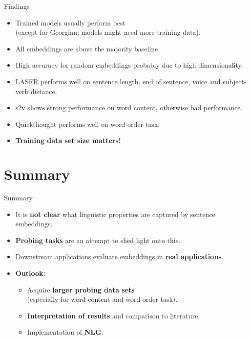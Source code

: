 \documentclass[accentcolor=tud1a,colorbacktitle,inverttitle,landscape,german,presentation,t]{tudbeamer}
\begin{document}
\begin{frame}{Findings}{}
	\vspace*{-4mm}
	\begin{itemize}\setlength\itemsep{1em}
		\item Trained models usually perform best \\
			(except for Georgian; models might need more training data).
		\item All embeddings are above the majority baseline.
		\item High accuracy for random embeddings probably due to high dimensionality. 
		\item LASER performs well on sentence length, end of sentence, voice and subject-verb distance.
		\item s2v shows strong performance on word content, otherwise bad performance.
		\item Quickthought performs well on word order task.
		\item \textbf{Training data set size matters!}
	\end{itemize}
\end{frame}


\section{Summary}


\begin{frame}{Summary}{}
	\begin{itemize}\setlength\itemsep{1em}
		\item It is \textbf{not clear} what linguistic properties are captured by sentence embeddings.
		\item \textbf{Probing tasks} are an attempt to shed light onto this.
		\item Downstream applications evaluate embeddings in \textbf{real applications}.
		\item \textbf{Outlook:}
		\begin{itemize}
			\item Acquire \textbf{larger probing data sets} \\
				(especially for word content and word order task).
			\item \textbf{Interpretation of results} and comparison to literature.
			\item Implementation of \textbf{NLG}.
		\end{itemize}
	\end{itemize}
\end{frame}
\end{document}
